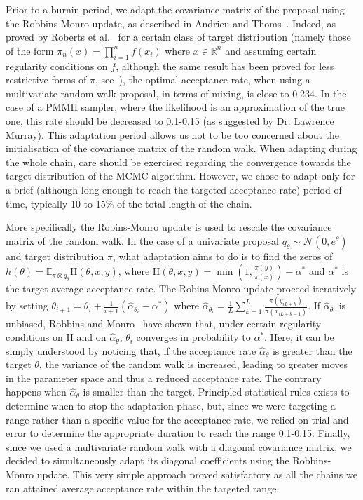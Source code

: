 \documentclass[12pt]{article}
\begin{document}
	Prior to a burnin period, we adapt the covariance matrix of the proposal using the Robbins-Monro update, as described in Andrieu and Thoms~\cite{Andrieu2008}. Indeed, as proved by Roberts et al.~\cite{roberts1997weak} for a certain class of target distribution (namely those of the form $\pi_n(x) = \prod_{i=1}^{n}f(x_i)$ where $x \in \mathbb{R}^n$ and assuming certain regularity conditions on $f$, although the same result has been proved for less restrictive forms of $\pi$, see~\cite{roberts2001optimal}), the optimal acceptance rate, when using a multivariate random walk proposal, in terms of mixing, is close to 0.234. In the case of a PMMH sampler, where the likelihood is an approximation of the true one, this rate should be decreased to 0.1-0.15 (as suggested by Dr. Lawrence Murray). This adaptation period allows us not to be too concerned about the initialisation of the covariance matrix of the random walk. When adapting during the whole chain, care should be exercised regarding the convergence towards the target distribution of the MCMC algorithm. However, we chose to adapt only for a brief (although long enough to reach the targeted acceptance rate) period of time, typically 10 to 15\% of the total length of the chain.
	
	More specifically the Robins-Monro update is used to rescale the covariance matrix of the random walk. In the case of a univariate proposal $q_\theta \sim \mathcal{N}(0,e^\theta)$ and target distribution $\pi$,  what adaptation aims to do is to find the zeros of $h(\theta) = \mathbb{E}_{\pi\otimes q_\theta}\mathrm{H}(\theta, x, y)$, where $\mathrm{H}(\theta, x, y) = \min(1, \frac{\pi(y)}{\pi(x)}) - \alpha^*$ and $\alpha^*$ is the target average acceptance rate. The Robins-Monro update proceed iteratively by setting $\theta_{i+1} = \theta_i + \frac{1}{i+1}(\hat{\alpha}_{\theta_i} - \alpha^*)$ where $\hat{\alpha}_{\theta_i} = \frac{1}{L}\sum_{k=1}^{L}\frac{\pi(y_{iL+k})}{\pi(x_{iL+k-1})}$. If $\hat{\alpha}_{\theta_i}$ is unbiased, Robbins and Monro~\cite{robbins1951stochastic} have shown that, under certain regularity conditions on H and on $\hat{\alpha}_\theta$, $\theta_i$ converges in probability to $\alpha^*$. Here, it can be simply understood by noticing that, if the acceptance rate $\hat{\alpha}_\theta$ is greater than the target $\theta$, the variance of the random walk is increased, leading to greater moves in the parameter space and thus a reduced acceptance rate. The contrary happens when $\hat{\alpha}_\theta$ is smaller than the target. Principled statistical rules exists to determine when to stop the adaptation phase, but, since we were targeting a range rather than a specific value for the acceptance rate,  we relied on trial and error to determine the appropriate duration to reach the range 0.1-0.15. Finally, since we used a multivariate random walk with a diagonal covariance matrix, we decided to simultaneously adapt its diagonal coefficients using the Robbins-Monro update. This very simple approach proved satisfactory as all the chains we ran attained average acceptance rate within the targeted range.
	
\end{document}

